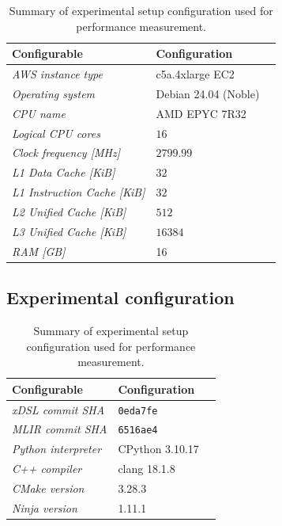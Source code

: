 \begin{table}[H]
  \caption{Summary of experimental setup configuration used for performance measurement.}
  \label{tab:experimental-setup}
  \centering
  \begin{tabular}{lll}
    \toprule
    \textbf{Configurable} & \textbf{Configuration} \\
    \midrule
    \textit{AWS instance type} & c5a.4xlarge EC2 \\
    \textit{Operating system} & Debian 24.04 (Noble) \\
    \textit{CPU name} & AMD EPYC 7R32 \\
    \textit{Logical CPU cores} & $16$ \\
    \textit{Clock frequency [MHz]} & $2799.99$ \\
    \textit{L1 Data Cache [KiB]} & $32$ \\
    \textit{L1 Instruction Cache [KiB]} & $32$ \\
    \textit{L2 Unified Cache [KiB]} & $512$ \\
    \textit{L3 Unified Cache [KiB]} & $16384$ \\
    \textit{RAM [GB]} & 16 \\
    \bottomrule
  \end{tabular}
\end{table}




\subsection{Experimental configuration}
\label{ssec:experimental-workloads}


\begin{table}[H]
  \caption{Summary of experimental setup configuration used for performance measurement.}
  \label{tab:experimental-setup}
  \centering
  \begin{tabular}{lll}
    \toprule
    \textbf{Configurable} & \textbf{Configuration} \\
    \midrule
    \textit{xDSL commit SHA} & \texttt{0eda7fe} \\
    \textit{MLIR commit SHA} & \texttt{6516ae4} \\
    \midrule
    \textit{Python interpreter} & CPython 3.10.17 \\
    \textit{C++ compiler} & clang 18.1.8 \\
    \textit{CMake version} & 3.28.3 \\
    \textit{Ninja version} & 1.11.1 \\
    \bottomrule
  \end{tabular}
\end{table}



